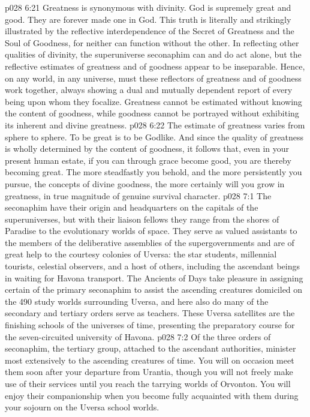 \vs p028 6:21 Greatness is synonymous with divinity. God is supremely great and good.  They are forever made one in God. This truth is literally and strikingly illustrated by the reflective interdependence of the Secret of Greatness and the Soul of Goodness, for neither can function without the other. In reflecting other qualities of divinity, the superuniverse seconaphim can and do act alone, but the reflective estimates of greatness and of goodness appear to be inseparable. Hence, on any world, in any universe, must these reflectors of greatness and of goodness work together, always showing a dual and mutually dependent report of every being upon whom they focalize. Greatness cannot be estimated without knowing the content of goodness, while goodness cannot be portrayed without exhibiting its inherent and divine greatness.
\vs p028 6:22 The estimate of greatness varies from sphere to sphere. To be great is to be Godlike. And since the quality of greatness is wholly determined by the content of goodness, it follows that, even in your present human estate, if you can through grace become good, you are thereby becoming great. The more steadfastly you behold, and the more persistently you pursue, the concepts of divine goodness, the more certainly will you grow in greatness, in true magnitude of genuine survival character.
\vs p028 7:1 The seconaphim have their origin and headquarters on the capitals of the superuniverses, but with their liaison fellows they range from the shores of Paradise to the evolutionary worlds of space. They serve as valued assistants to the members of the deliberative assemblies of the supergovernments and are of great help to the courtesy colonies of Uversa: the star students, millennial tourists, celestial observers, and a host of others, including the ascendant beings in waiting for Havona transport. The Ancients of Days take pleasure in assigning certain of the primary seconaphim to assist the ascending creatures domiciled on the 490 study worlds surrounding Uversa, and here also do many of the secondary and tertiary orders serve as teachers. These Uversa satellites are the finishing schools of the universes of time, presenting the preparatory course for the seven\hyp{}circuited university of Havona.
\vs p028 7:2 \pc Of the three orders of seconaphim, the tertiary group, attached to the ascendant authorities, minister most extensively to the ascending creatures of time. You will on occasion meet them soon after your departure from Urantia, though you will not freely make use of their services until you reach the tarrying worlds of Orvonton. You will enjoy their companionship when you become fully acquainted with them during your sojourn on the Uversa school worlds.
